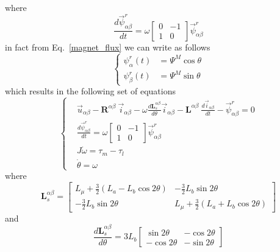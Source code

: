 \documentclass[11pt,a4paper,oneside]{book}
\numberwithin{equation}{section}
\theoremstyle{it}
\theoremstyle{definition}
\begin{document}
where $$\frac{d\vec{\psi}^r_{\alpha\beta}}{dt} = \omega \begin{bmatrix} 0 & -1 
	\\ 1 & 0\end{bmatrix} \vec{\psi}^r_{\alpha\beta}$$
in fact from Eq.~\ref{magnet_flux} we can write as follows
\begin{equation}\label{magnet_flux_ab}
	\left\lbrace \begin{aligned}
		\psi_\alpha^r(t) &= \Psi^M\cos\theta \\[6pt]
		\psi_\beta^r(t) &= \Psi^M\sin\theta
	\end{aligned} \right. 
\end{equation}
which results in the following set of equations
\begin{equation}\label{twophase_eq1}
	\left\lbrace \begin{aligned}
		& \vec{u}_{\alpha\beta}-\mathbf{R}^{\alpha\beta}\ 
		\vec{i}_{\alpha\beta}-\omega\frac{d\mathbf{L}_s^{\alpha\beta}}{d\theta}\vec{i}_{\alpha\beta}-\mathbf{L}^{\alpha\beta}\
		\frac{d\vec{i}_{\alpha\beta}}{dt}-\vec{\psi}^r_{\alpha\beta} = 0 
		\\[6pt]
		& \frac{d\vec{\psi}^r_{\alpha\beta}}{dt} = \omega \begin{bmatrix} 0 & 
			-1 \\ 1 & 0\end{bmatrix} \vec{\psi}^r_{\alpha\beta} \\[6pt]
		& J\dot{\omega} = \tau_m-\tau_l \\[6pt]
		& \dot{\theta} = \omega
	\end{aligned} \right. 
\end{equation}
where
\begin{equation}\label{Lab}
	\mathbf{L}_s^{\alpha\beta} = 
	\begin{bmatrix} 
		L_{\mu}+\frac{3}{2}(L_a-L_b\cos2\theta) & -\frac{3}{2}L_b\sin2\theta 
		\\[6pt]
		-\frac{3}{2}L_b\sin2\theta & L_{\mu}+\frac{3}{2}(L_a+L_b\cos2\theta)
	\end{bmatrix}
\end{equation}
and
\begin{equation}
	\frac{d\mathbf{L}_s^{\alpha\beta}}{d\theta} = 3L_b
	\begin{bmatrix} 
		\sin 2\theta & -\cos 2\theta \\[6pt]
		-\cos 2\theta & -\sin 2\theta
	\end{bmatrix}
\end{equation}
\end{document}
